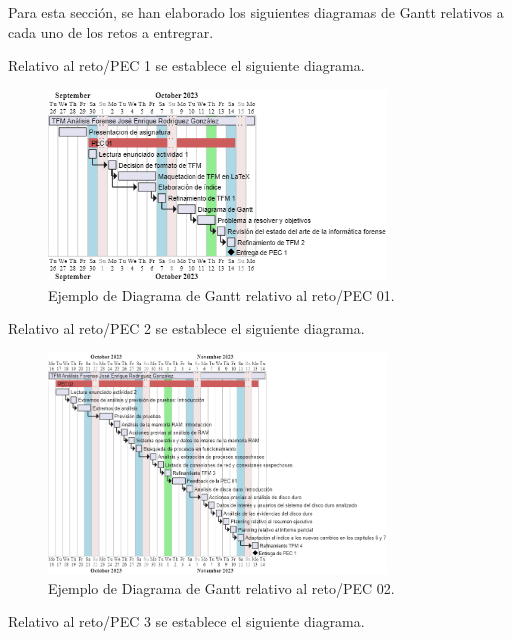 Para esta sección, se han elaborado los siguientes diagramas de Gantt relativos a cada uno de los retos a entregrar.

\noindent Relativo al reto/PEC 1 se establece el siguiente diagrama.

\begin{figure}[htp]
    \centering
    \includegraphics[width=0.8\textwidth]{imagenes/003-diagrama-de-gantt-pec-01.png} 
    \caption{Ejemplo de Diagrama de Gantt relativo al reto/PEC 01.}
    \label{fig:ejemplo_gantt}
\end{figure}

\clearpage

\noindent Relativo al reto/PEC 2 se establece el siguiente diagrama.

\begin{figure}[htp]
    \centering
    \includegraphics[width=0.8\textwidth]{imagenes/004-diagrama-de-gantt-pec-02.png} 
    \caption{Ejemplo de Diagrama de Gantt relativo al reto/PEC 02.}
    \label{fig:ejemplo_gantt}
\end{figure}

\clearpage

\noindent Relativo al reto/PEC 3 se establece el siguiente diagrama.

